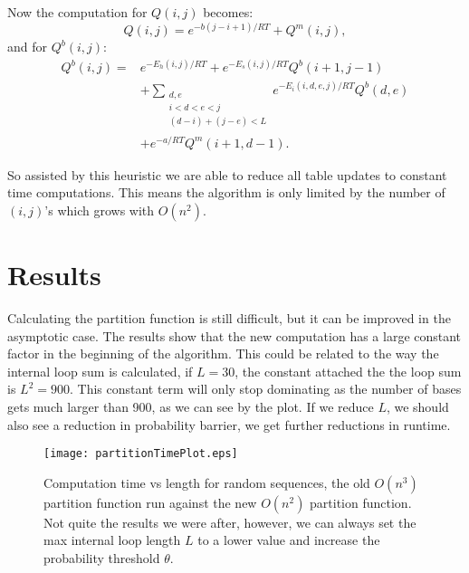 Now the computation for $Q(i,j)$ becomes:
\begin{equation}
Q(i,j) = e^{-b(j-i+1)/RT} + Q^m(i, j),
\end{equation} 
and for $Q^b(i,j)$:
\begin{equation}
\begin{split}
 Q^b(i, j) =& e^{-E_h(i,j)/RT}+
e^{-E_s(i, j)/RT} Q^b(i+1, j-1) \\ 
& + \sum_{\substack{d,e \\ i < d< e< j\\ (d-i) + (j-e) < L}} e^{-E_i(i, d, e, j)/RT}Q^b(d,e) \\ 
& + e^{-a/RT}Q^m(i+1, d-1) .
\end{split}
\end{equation}

So assisted by this heuristic we are able to reduce all table updates
to constant time computations. This means the algorithm is only
limited by the number of $(i,j)$'s which grows with $O(n^2)$. 

\section{Results}

Calculating the partition function is still difficult, but it can be
improved in the asymptotic case. The results show that the new
computation has a large constant factor in the beginning of the
algorithm. This could be related to the way the internal loop sum is
calculated, if $L=30$, the constant attached the the loop sum is
$L^2=900$. This constant term will only stop dominating as the number
of bases gets much larger than 900, as we can see by the plot. If we
reduce $L$, we should also see a reduction in  probability barrier, we
get further reductions in runtime.

\begin{figure}
\centering
\texttt{[image: partitionTimePlot.eps]} 
\caption{Computation time vs length for random sequences, the old
  $O(n^3)$ partition function run against the new $O(n^2)$ partition
  function. Not quite the results we were after, however, we can
  always set the max internal loop length $L$ to a lower value and
  increase the probability threshold $\theta$.}
\label{fig:pfResults}
\end{figure}



